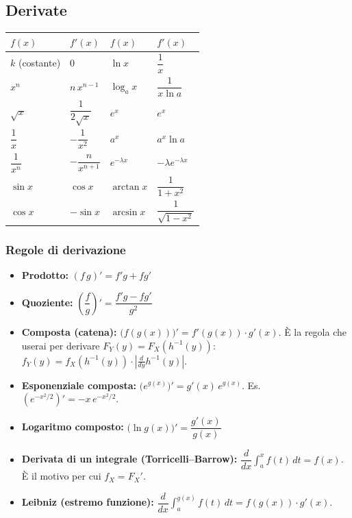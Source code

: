 \documentclass[12pt]{extarticle} %
\begin{document}
\subsection{Derivate}
\begin{center}
\renewcommand{\arraystretch}{1.6}
\begin{tabular}{|l|l||l|l|}
\hline
$f(x)$ & $f'(x)$ & $f(x)$ & $f'(x)$ \\ \hline
$k$ (costante) & $0$ & $\ln x$ & $\dfrac{1}{x}$ \\ \hline
$x^n$ & $n\,x^{n-1}$ & $\log_a x$ & $\dfrac{1}{x \ln a}$ \\ \hline
$\sqrt{x}$ & $\dfrac{1}{2\sqrt{x}}$ & $e^x$ & $e^x$ \\ \hline
$\dfrac{1}{x}$ & $-\dfrac{1}{x^2}$ & $a^x$ & $a^x \ln a$ \\ \hline
$\dfrac{1}{x^n}$ & $-\dfrac{n}{x^{n+1}}$ & $e^{-\lambda x}$ & $-\lambda e^{-\lambda x}$ \\ \hline
$\sin x$ & $\cos x$ & $\arctan x$ & $\dfrac{1}{1+x^2}$ \\ \hline
$\cos x$ & $-\sin x$ & $\arcsin x$ & $\dfrac{1}{\sqrt{1-x^2}}$ \\ \hline
\end{tabular}
\end{center}

\subsubsection{Regole di derivazione}
\begin{itemize}
    \item \textbf{Prodotto:} $(f\,g)' = f'g + f g'$
    \item \textbf{Quoziente:} $\left(\dfrac{f}{g}\right)' = \dfrac{f'g - f g'}{g^2}$
    \item \textbf{Composta (catena):} $\big(f(g(x))\big)' = f'(g(x))\cdot g'(x)$. {\footnotesize È la regola che userai per derivare $F_Y(y) = F_X(h^{-1}(y))$: $f_Y(y) = f_X(h^{-1}(y))\cdot \left|\frac{d}{dy}h^{-1}(y)\right|$.}
    \item \textbf{Esponenziale composta:} $\big(e^{g(x)}\big)' = g'(x)\,e^{g(x)}$. \; Es. $\left(e^{-x^2/2}\right)' = -x\,e^{-x^2/2}$.
    \item \textbf{Logaritmo composto:} $\big(\ln g(x)\big)' = \dfrac{g'(x)}{g(x)}$
    \item \textbf{Derivata di un integrale (Torricelli--Barrow):} $\dfrac{d}{dx}\displaystyle\int_a^{x} f(t)\,dt = f(x)$. {\footnotesize È il motivo per cui $f_X = F_X'$.}
    \item \textbf{Leibniz (estremo funzione):} $\dfrac{d}{dx}\displaystyle\int_a^{g(x)} f(t)\,dt = f(g(x))\cdot g'(x)$.
\end{itemize}
\end{document}
